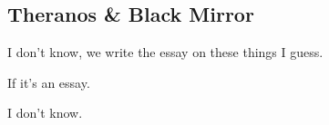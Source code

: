 \subsection{Theranos \& Black Mirror}

I don't know, we write the essay on these things I guess.

If it's an essay.

I don't know.


\vspace{10pt}


















